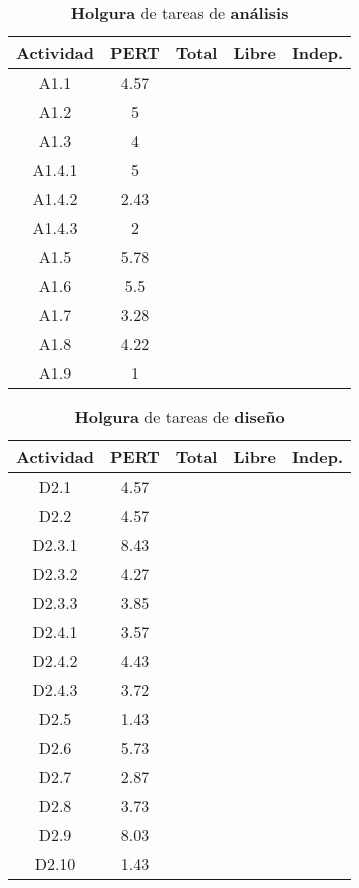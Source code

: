 \documentclass[11pt,a4paper,spanish,twoside]{report}
\begin{document}
\begin{table}[!h]
  \centering
  \begin{tabular}{|c||c||c|c|c|}
    \hline
    \textbf{Actividad} & \textbf{PERT} & \textbf{Total} & \textbf{Libre}
    & \textbf{Indep.}\\
    \hline \hline
    A1.1 & 4.57 & & & \\ 
    \hline
    A1.2 & 5 & & & \\
    \hline 
    A1.3 & 4 & & & \\
    \hline
    A1.4.1 & 5 & & & \\
    \hline
    A1.4.2 & 2.43 & & & \\
    \hline
    A1.4.3 & 2 & & & \\
    \hline
    A1.5 & 5.78 & & & \\
    \hline
    A1.6 & 5.5 & & & \\
    \hline
    A1.7 & 3.28 & & & \\
    \hline
    A1.8 & 4.22 & & & \\
    \hline
    A1.9 & 1 & & &\\
    \hline
  \end{tabular}
  \caption{\textbf{Holgura} de tareas de \textbf{análisis}} 
  \label{Tab:hol1}
\end{table}

\begin{table}[!h]
\centering
  \begin{tabular}{|c||c||c|c|c|}
    \hline
     \textbf{Actividad} & \textbf{PERT} & \textbf{Total} & \textbf{Libre}
    & \textbf{Indep.}\\
    \hline \hline
    D2.1 & 4.57 & & & \\
    \hline
    D2.2 & 4.57 & & & \\
    \hline
    D2.3.1 & 8.43 & & & \\
    \hline
    D2.3.2 & 4.27 & & & \\
    \hline
    D2.3.3 & 3.85 & & & \\
    \hline
    D2.4.1 & 3.57 & & & \\
    \hline
    D2.4.2 & 4.43 & & & \\
    \hline
    D2.4.3 & 3.72 & & & \\
    \hline
    D2.5 & 1.43 & & & \\
    \hline
    D2.6 & 5.73 & & & \\
    \hline
    D2.7 & 2.87 & & & \\
    \hline
    D2.8 & 3.73 & & &  \\
    \hline
    D2.9 & 8.03 & & & \\
    \hline
    D2.10 & 1.43 & & & \\
    \hline
  \end{tabular}
  \caption{\textbf{Holgura} de tareas de \textbf{diseño}}
  \label{Tab:hol2}
\end{table}
\end{document}
